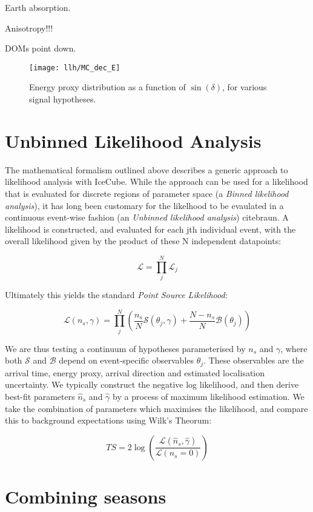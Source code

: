 Earth absorption.

Anisotropy!!!

DOMs point down.

\begin{figure}[!ht]
	\centering \texttt{[image: llh/MC\_dec\_E]}
	\caption{Energy proxy distribution as a function of $\sin(\delta)$, for various signal hypotheses.}
	\label{fig:mc_dec_e}
\end{figure}

\section{Unbinned Likelihood Analysis}
The mathematical formalism outlined above describes a generic approach to likelihood analysis with IceCube. While the approach can be used for a likelihood that is evaluated for discrete regions of parameter space (a \emph{Binned likelihood analysis}), it has long been customary for the likelhood to be evaulated in a continuous event-wise fashion (an \emph{Unbinned likelihood analysis}) citebraun. A likelihood is constructed, and evaluated for each jth individual event, with the overall likelihood given by the product of these N independent datapoints:

\[ \mathcal{L} = \prod_{j}^{N} \mathcal{L}_{j} \]

Ultimately this yields the standard \emph{Point Source Likelihood}:

\[ \mathcal{L}(n_{s}, \gamma) = \prod_{j}^{N} \left(\frac{n_{s}}{N} \mathcal{S}(\theta_{j}, \gamma) + \frac{N - n_{s}}{N} \mathcal{B}(\theta_{j})  \right)\]

We are thus testing a continuum of hypotheses parameterised by $n_{s}$ and $\gamma$, where both $\mathcal{S}$ and $\mathcal{B}$ depend on event-specific observables $\theta_{j}$. These observables are the arrival time, energy proxy, arrival direction and estimated localisation uncertainty. We typically construct the negative log likelihood, and then derive best-fit parameters $\hat{n}_{s}$ and  $\hat{\gamma}$ by a process of maximum likelihood estimation. We take the combination of parameters which maximises the likelihood, and compare this to background expectations using Wilk's Theorum:

\[ TS = 2 \log \left( \frac{ \mathcal{L}(\hat{n}_{s}, \hat{\gamma}) }{\mathcal{L}(n_{s} = 0)} \right)\]

\section{Combining seasons}

